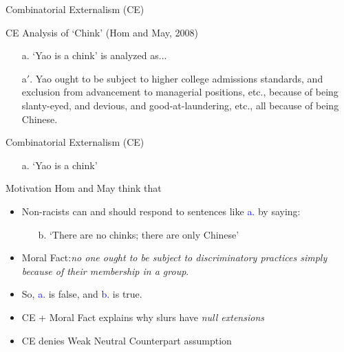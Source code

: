 \documentclass[xcolor=dvipsnames,12pt,handout]{beamer}
\begin{document}
\begin{frame}{Combinatorial Externalism (CE)}
\pause
\begin{block}{CE Analysis of `Chink' (Hom and May, 2008)}
\begin{enumerate}
\item[a.] `Yao is a chink' is analyzed as...
\pause
\item[a$'$.] Yao ought to be subject to higher college admissions standards, and exclusion from advancement to managerial positions, etc., because of being slanty-eyed, and devious, and good-at-laundering, etc., all because of being Chinese.
\end{enumerate}
\end{block}
\end{frame}

\begin{frame}{Combinatorial Externalism (CE)}

\begin{itemize}
\vspace{-.4cm}
\item[a.] `Yao is a chink'
\end{itemize}

\begin{block}{Motivation}
Hom and May think that
\begin{itemize}
\item Non-racists can and should respond to sentences like \textcolor{blue}{a.} by saying:
\pause
\begin{itemize}
\item[b.] `There are no chinks; there are only Chinese'
\pause
\end{itemize}
\item Moral Fact:\textit{no one ought to be subject to discriminatory practices simply because of their membership in a group}.
\pause
\item So, \textcolor{blue}{a.} is false, and \textcolor{blue}{b.} is true.
\pause
\item CE + Moral Fact explains why slurs have \textit{null extensions}
\pause
\item CE denies Weak Neutral Counterpart assumption

\end{itemize}
\end{block}

\end{frame}
\end{document}
